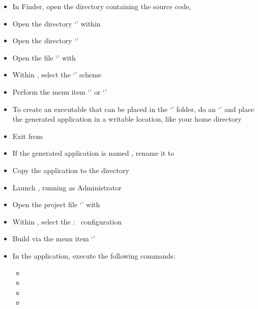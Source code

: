 \begin{itemize}
\item In Finder, open the directory containing the \mplusm{} source code,
\item\exSp{}Open the directory `' within
\item\exSp{}Open the directory `'
\item\exSp{}Open the file `' with 
\item\exSp{}Within , select the `' scheme
\item\exSp{}Perform the menu item `' or
`'
\item\exSp{}To create an executable that can be placed in the `'
folder, do an `'
and place the generated application in a writable location, like your home directory
\item\exSp{}Exit from 
\item\exSp{}If the generated application is named , rename
it to 
\item\exSp{}Copy the  application to the 
directory
\end{itemize}
\tertiaryEnd
{}
\begin{itemize}
\item Launch , running as Administrator
\item\exSp{}Open the project file
`' with
\item\exSp{}Within , select the  :\ 
configuration
\item\exSp{}Build via the menu item `'
\end{itemize}
\tertiaryEnd
{}
\begin{itemize}
\item In the  application, execute the following commands:
\begin{itemize}
\item {}
\item\exSp{}
\item\exSp{}
\item\exSp{}
\end{itemize}
\end{itemize}
